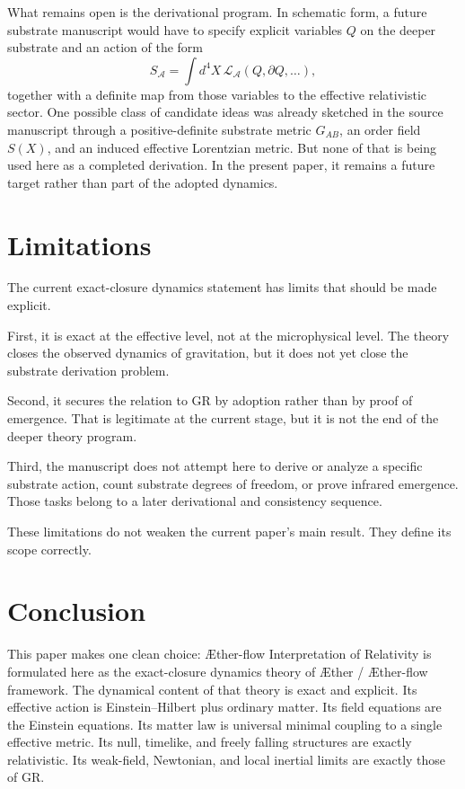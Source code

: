 \documentclass[11pt]{article}
\newcommand{\Aether}{\AE{}ther}
\newcommand{\Aflow}{\AE{}ther-flow}
\newcommand{\TheoryName}{\Aflow{} Interpretation of Relativity}
\newcommand{\TheoryProgram}{\Aether{} / \Aflow{} framework}
\newcommand{\Sub}{\mathcal{A}}
\begin{document}
What remains open is the derivational program. In schematic form, a future substrate manuscript would have to specify explicit variables \(Q\) on the deeper substrate and an action of the form
\begin{equation}
S_{\Sub}
=
\int d^4X\,\mathcal{L}_{\Sub}(Q,\partial Q,\ldots),
\label{eq:substrateaction}
\end{equation}
together with a definite map from those variables to the effective relativistic sector. One possible class of candidate ideas was already sketched in the source manuscript through a positive-definite substrate metric \(G_{AB}\), an order field \(S(X)\), and an induced effective Lorentzian metric. But none of that is being used here as a completed derivation. In the present paper, it remains a future target rather than part of the adopted dynamics.

\section{Limitations}

The current exact-closure dynamics statement has limits that should be made explicit.

First, it is exact at the effective level, not at the microphysical level. The theory closes the observed dynamics of gravitation, but it does not yet close the substrate derivation problem.

Second, it secures the relation to GR by adoption rather than by proof of emergence. That is legitimate at the current stage, but it is not the end of the deeper theory program.

Third, the manuscript does not attempt here to derive or analyze a specific substrate action, count substrate degrees of freedom, or prove infrared emergence. Those tasks belong to a later derivational and consistency sequence.

These limitations do not weaken the current paper's main result. They define its scope correctly.

\section{Conclusion}

This paper makes one clean choice: \TheoryName{} is formulated here as the exact-closure dynamics theory of \TheoryProgram{}. The dynamical content of that theory is exact and explicit. Its effective action is Einstein--Hilbert plus ordinary matter. Its field equations are the Einstein equations. Its matter law is universal minimal coupling to a single effective metric. Its null, timelike, and freely falling structures are exactly relativistic. Its weak-field, Newtonian, and local inertial limits are exactly those of GR.
\end{document}
